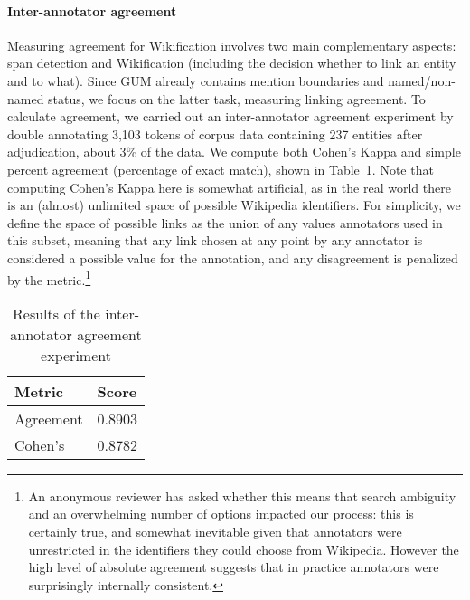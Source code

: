 \documentclass[11pt,a4paper]{article}
\begin{document}
\paragraph{Inter-annotator agreement} Measuring agreement for Wikification involves two main complementary aspects: span detection and Wikification (including the decision whether to link an entity and to what). Since GUM already contains mention boundaries and named/non-named status, we focus on the latter task, measuring linking agreement. To calculate agreement, we carried out an inter-annotator agreement experiment by double annotating 3,103 tokens of corpus data containing 237 entities after adjudication, about 3\% of the data. We compute both Cohen's Kappa and simple percent agreement (percentage of exact match), shown in Table~\ref{tb:3}. Note that computing Cohen's Kappa here is somewhat artificial, as in the real world there is an (almost) unlimited space of possible Wikipedia identifiers. For simplicity, we define the space of possible links as the union of any values annotators used in this subset, meaning that any link chosen at any point by any annotator is considered a possible value for the annotation, and any disagreement is penalized by the metric.\footnote{An anonymous reviewer has asked whether this means that search ambiguity and an overwhelming number of options impacted our process: this is certainly true, and somewhat inevitable given that annotators were unrestricted in the identifiers they could choose from Wikipedia. However the high level of absolute agreement suggests that in practice annotators were surprisingly internally consistent.}

\begin{table}[h!tb]
\begin{center}
\begin{tabular}{ l l } 
 \hline
 Metric & Score \\ 
 \hline
 Agreement & 0.8903  \\
 Cohen's  & 0.8782 \\
 \hline
\end{tabular}
\caption{Results of the inter-annotator agreement experiment}
\label{tb:3}
\end{center}
\end{table}
\end{document}
